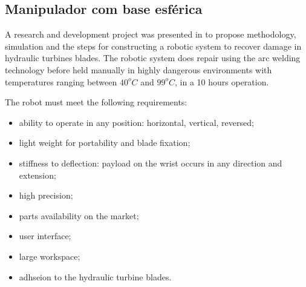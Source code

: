 \subsection{Manipulador com base esférica}
A research and development project was presented in
\cite{motta2010prototype} to propose methodology, simulation and
the steps for constructing a robotic system to recover damage
in hydraulic turbines blades. The robotic system does
repair using the arc welding technology before held
manually in highly dangerous environments with temperatures ranging
between $ 40^o C$ and $ 99^o C$, in a 10 hours operation.

The robot must meet the following requirements:
\begin{itemize}
   \item ability to operate in any position: horizontal, vertical,
   reversed;
   \item light weight for portability and blade fixation;
   \item stiffness to deflection: payload on the wrist occurs in any
   direction and extension;
   \item high precision;
   \item parts availability on the market;
   \item user interface;
   \item large workspace;
   \item adhseion to the hydraulic turbine blades.
\end{itemize}


